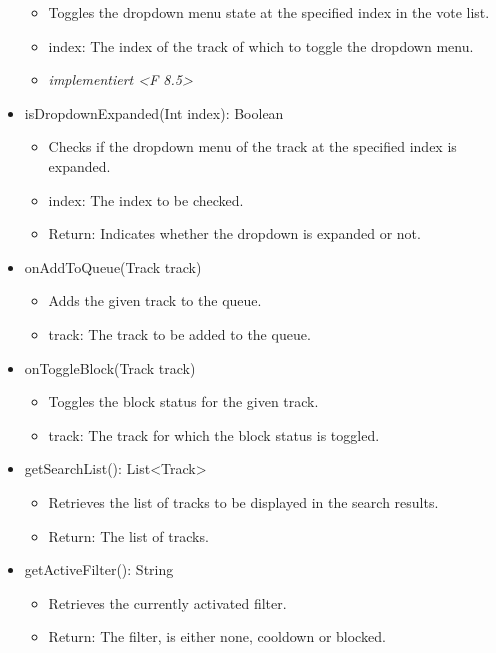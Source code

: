 \documentclass[oneside, ngerman]{sdqtechreport}
\begin{document}
\begin{itemize}
        \begin{itemize}
            \item Toggles the dropdown menu state at the specified index in the vote list.
            \item index: The index of the track of which to toggle the dropdown menu.
            \item \textit{implementiert <F 8.5>}
        \end{itemize}
    \item isDropdownExpanded(Int index): Boolean
        \begin{itemize}
            \item Checks if the dropdown menu of the track at the specified index is expanded.
            \item index: The index to be checked.
            \item Return: Indicates whether the dropdown is expanded or not.
        \end{itemize}
    \item onAddToQueue(Track track)
        \begin{itemize}
            \item Adds the given track to the queue.
            \item track: The track to be added to the queue.
        \end{itemize}
    \item onToggleBlock(Track track)
        \begin{itemize}
            \item Toggles the block status for the given track.
            \item track: The track for which the block status is toggled.
        \end{itemize}
    \item getSearchList(): List<Track>
        \begin{itemize}
            \item Retrieves the list of tracks to be displayed in the search results.
            \item Return: The list of tracks.
        \end{itemize}
    \item getActiveFilter(): String
        \begin{itemize}
            \item Retrieves the currently activated filter.
            \item Return: The filter, is either none, cooldown or blocked.

\end{itemize}
\end{itemize}
\end{document}

